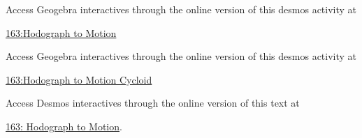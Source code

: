 \documentclass{ximera}
\begin{document}
\begin{exploration}   \label{E67ugfdgtrt}
\begin{onlineOnly}
    \begin{center}
\end{center}
\end{onlineOnly}



\end{exploration}
 


\begin{exploration}

Access Geogebra interactives through the online version of this desmos activity at

\href{https://www.geogebra.org/classic/pdefd7mb}{163:Hodograph to Motion}

\begin{onlineOnly}
    \begin{center}
\end{center}
\end{onlineOnly}



Access Geogebra interactives through the online version of this desmos activity at

\href{https://www.geogebra.org/classic/z4r5quj4}{163:Hodograph to Motion Cycloid}
 
\begin{onlineOnly}
    \begin{center}
\end{center}
\end{onlineOnly}




\end{exploration}








\begin{exploration}
\begin{onlineOnly}
    \begin{center}
\end{center}
\end{onlineOnly}


Access Desmos interactives through the online version of this text at

 
\href{https://www.desmos.com/calculator/ljnsc6jsvt}{163: Hodograph to Motion}.

\end{exploration}
\end{document}
